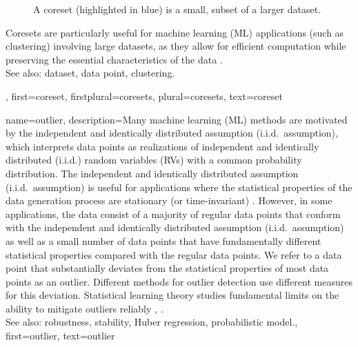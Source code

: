 {{{\begin{figure}[H]
\caption{A coreset (highlighted in blue) is a small, subset of a larger dataset. \label{fig_coreset_dict}}
\end{figure}
		Coresets are particularly useful for machine learning (ML) applications (such as clustering) 
		involving large datasets, as they allow for efficient computation while 
		preserving the essential characteristics of the data \cite{DistkmeansBalcan2013}.
				\\
		See also: dataset, data point, clustering.},
	first={coreset},
	firstplural={coresets},
	plural={coresets},
	text={coreset} 
}


{name={outlier}, 
	description={Many machine learning (ML) methods 
		are motivated by the independent and identically distributed assumption (i.i.d.\ assumption), which interprets data points as realizations of 
		independent and identically distributed (i.i.d.) random variables (RVs) with a common probability distribution. The independent and identically distributed assumption (i.i.d.\ assumption) is useful for applications  
		where the statistical properties of the data generation process are stationary (or time-invariant) \cite{Brockwell91}. 
		However, in some applications, the data consist of a majority of regular data points 
		that conform with the independent and identically distributed assumption (i.i.d.\ assumption) as well as a small number of data points that have fundamentally different 
       		statistical properties compared with the regular data points. We refer to 
			a data point that substantially deviates from the statistical properties of 
			    most data points as an outlier. Different methods for outlier detection 
				use different measures for this deviation. 
        		Statistical learning theory studies fundamental limits on the ability to 
				mitigate outliers reliably \cite{doi:10.1137/0222052}, \cite{10.1214/20-AOS1961}.
        		\\
		See also: robustness, stability, Huber regression, probabilistic model.},
	 first={outlier},
	 text={outlier} 
}

}
